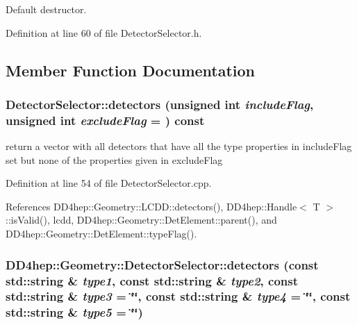 Default destructor. 

Definition at line 60 of file DetectorSelector.h.

\subsection{Member Function Documentation}
\hypertarget{class_d_d4hep_1_1_geometry_1_1_detector_selector_ab87dfdbdee0e921660d7f54bbdc02a9f}{
\subsubsection[{detectors}]{ DetectorSelector::detectors (unsigned int {\em includeFlag}, \/  unsigned int {\em excludeFlag} = {}) const}}
\label{class_d_d4hep_1_1_geometry_1_1_detector_selector_ab87dfdbdee0e921660d7f54bbdc02a9f}
return a vector with all detectors that have all the type properties in includeFlag set but none of the properties given in excludeFlag 

Definition at line 54 of file DetectorSelector.cpp.

References DD4hep::Geometry::LCDD::detectors(), DD4hep::Handle$<$ T $>$::isValid(), lcdd, DD4hep::Geometry::DetElement::parent(), and DD4hep::Geometry::DetElement::typeFlag().\hypertarget{class_d_d4hep_1_1_geometry_1_1_detector_selector_a2e5d96725e4b37a6cea8e7c704d91a87}{
\subsubsection[{detectors}]{ DD4hep::Geometry::DetectorSelector::detectors (const std::string \& {\em type1}, \/  const std::string \& {\em type2}, \/  const std::string \& {\em type3} = {\ttfamily \char`\"{}\char`\"{}}, \/  const std::string \& {\em type4} = {\ttfamily \char`\"{}\char`\"{}}, \/  const std::string \& {\em type5} = {\ttfamily \char`\"{}\char`\"{}})}}
\label{class_d_d4hep_1_1_geometry_1_1_detector_selector_a2e5d96725e4b37a6cea8e7c704d91a87}


